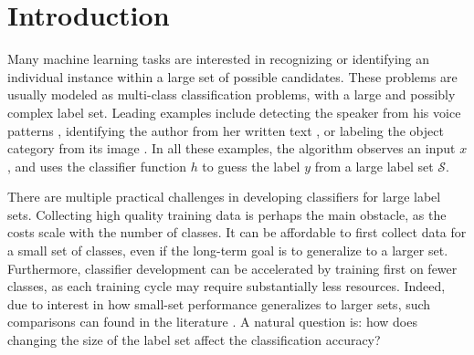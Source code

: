 \documentclass[twoside,11pt]{article}
\begin{document}

\section{Introduction}\label{sec:recog_tasks}

Many machine learning tasks are interested in recognizing or
identifying an individual instance within a large set of possible
candidates. These problems are usually modeled as multi-class
classification problems, with a large and possibly complex label
set. Leading examples include detecting the speaker from his voice
patterns \citep{togneri2011overview}, identifying the author from her
written text \citep{stamatatos2014overview}, or labeling the object
category from its image
\citep{duygulu2002object,deng2010does,oquab2014learning}.  In all
these examples, the algorithm observes an input $x$, and uses the
classifier function $h$ to guess the label $y$ from a large label set
$\mathcal{S}$.

There are multiple practical challenges in developing classifiers for large label sets. Collecting high quality training data is
perhaps the main obstacle, as the costs scale with the number of
classes.  It can be affordable to first collect data for a small set
of classes, even if the long-term goal is to generalize to a larger
set.  Furthermore, classifier development can be accelerated by
training first on fewer classes, as each training cycle may require
substantially less resources.  Indeed, due to interest in how
small-set performance generalizes to larger sets, such comparisons can
found in the literature \citep{oquab2014learning, griffin2007caltech}.
A natural question is: how does changing the size of the label set
affect the classification accuracy?
\end{document}
